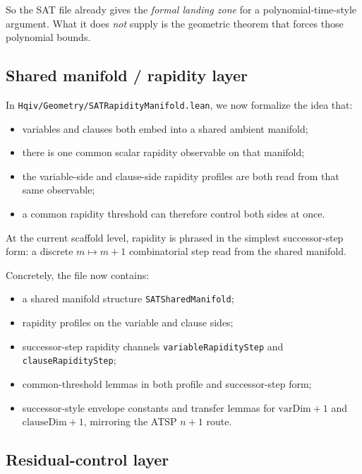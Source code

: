 \documentclass[11pt]{article}
\begin{document}
So the SAT file already gives the \emph{formal landing zone} for a polynomial-time-style
argument. What it does \emph{not} supply is the geometric theorem that forces those
polynomial bounds.

\subsection{Shared manifold / rapidity layer}

In \texttt{Hqiv/Geometry/SATRapidityManifold.lean}, we now formalize the idea that:

\begin{itemize}[leftmargin=2em]
  \item variables and clauses both embed into a shared ambient manifold;
  \item there is one common scalar rapidity observable on that manifold;
  \item the variable-side and clause-side rapidity profiles are both read from that
  same observable;
  \item a common rapidity threshold can therefore control both sides at once.
\end{itemize}

At the current scaffold level, rapidity is phrased in the simplest successor-step
form: a discrete \(m \mapsto m+1\) combinatorial step read from the shared manifold.

Concretely, the file now contains:

\begin{itemize}[leftmargin=2em]
  \item a shared manifold structure \texttt{SATSharedManifold};
  \item rapidity profiles on the variable and clause sides;
  \item successor-step rapidity channels \texttt{variableRapidityStep} and
  \texttt{clauseRapidityStep};
  \item common-threshold lemmas in both profile and successor-step form;
  \item successor-style envelope constants and transfer lemmas for
  \(\text{varDim}+1\) and \(\text{clauseDim}+1\), mirroring the ATSP \(n+1\) route.
\end{itemize}

\subsection{Residual-control layer}
\end{document}
